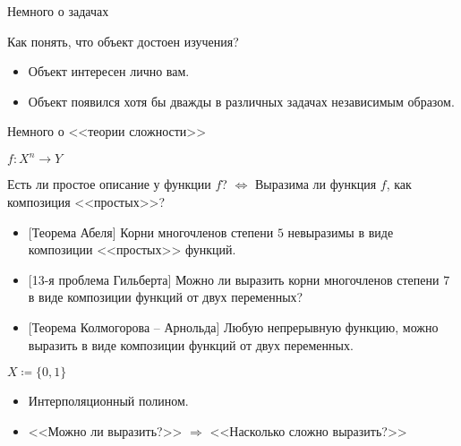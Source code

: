 \begin{frame}{Немного о задачах}

    Как понять, что объект достоен изучения?

    \pause
    \begin{itemize}
        \item Объект интересен лично вам.
        \pause
        \item Объект появился хотя бы \alert{дважды} в различных задачах независимым образом.
    \end{itemize}
\end{frame}


\begin{frame}{Немного о <<теории сложности>>}

    $f\colon X^n \to Y$

    Есть ли простое описание у функции $f$? \pause $\Leftrightarrow$ Выразима ли функция $f$, как
    композиция <<простых>>?

    \pause

    \begin{itemize}
        \item{} [Теорема Абеля] Корни многочленов степени $5$ невыразимы в виде композиции <<простых>>
            функций.
            \pause
        \item{} [13-я проблема Гильберта] Можно ли выразить корни многочленов степени $7$ в виде
            композиции функций от двух переменных?
            \pause
        \item{} [Теорема Колмогорова -- Арнольда] Любую непрерывную функцию, можно выразить в виде
            композиции функций от двух переменных.      
    \end{itemize}

    \vspace{0.5cm}
    \pause
    $X \coloneqq \{0, 1\}$
    \begin{itemize}
        \item Интерполяционный полином.
        \pause
        \item{} <<Можно ли выразить?>> $\Rightarrow$ <<Насколько сложно выразить?>>
    \end{itemize}
\end{frame}


